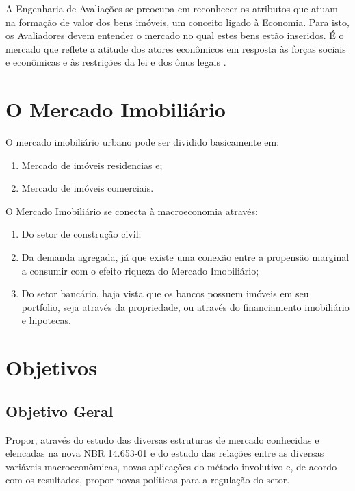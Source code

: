\documentclass[
	12pt,				%
	oneside,			%
	a4paper,			%
	chapter=TITLE,		%
	section=TITLE,		%
	english,			%
	brazil				%
	]{abntex2}
\begin{document}
A Engenharia de Avaliações se preocupa em reconhecer os atributos que
atuam na formação de valor dos bens imóveis, um conceito ligado à
Economia. Para isto, os Avaliadores devem entender o mercado no qual
estes bens estão inseridos. É o mercado que reflete a atitude dos atores
econômicos em resposta às forças sociais e econômicas e às restrições da
lei e dos ônus legais \autocite[10]{realestate}.

\section{O Mercado Imobiliário}\label{o-mercado-imobiliuxe1rio}

O mercado imobiliário urbano pode ser dividido basicamente em:
\begin{enumerate}
\def\labelenumi{\arabic{enumi}.}
\tightlist
\item
  Mercado de imóveis residencias e;
\item
  Mercado de imóveis comerciais.
\end{enumerate}
O Mercado Imobiliário se conecta à macroeconomia através:
\begin{enumerate}
\def\labelenumi{\arabic{enumi}.}
\tightlist
\item
  Do setor de construção civil;
\item
  Da demanda agregada, já que existe uma conexão entre a propensão
  marginal a consumir com o efeito riqueza do Mercado Imobiliário;
\item
  Do setor bancário, haja vista que os bancos possuem imóveis em seu
  portfolio, seja através da propriedade, ou através do financiamento
  imobiliário e hipotecas.
\end{enumerate}
\section{Objetivos}\label{objetivos}

\subsection{Objetivo Geral}\label{objetivo-geral}

Propor, através do estudo das diversas estruturas de mercado conhecidas
e elencadas na nova NBR 14.653-01 \autocite{NBR1465301} e do estudo das
relações entre as diversas variáveis macroeconômicas, novas aplicações
do método involutivo e, de acordo com os resultados, propor novas
políticas para a regulação do setor.
\end{document}
